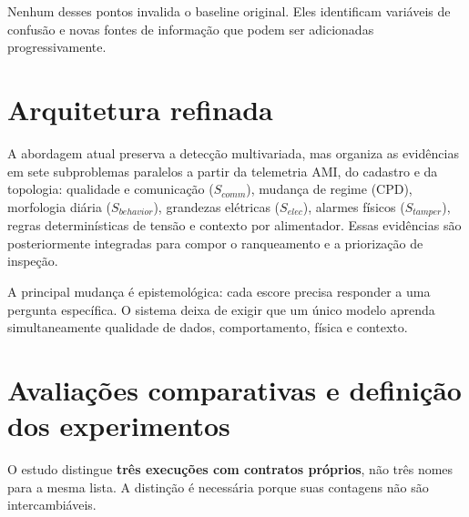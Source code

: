 Nenhum desses pontos invalida o baseline original. Eles identificam variáveis de confusão e novas fontes de informação que podem ser adicionadas progressivamente.

\section{Arquitetura refinada}\label{arquitetura-refinada}

A abordagem atual preserva a detecção multivariada, mas organiza as evidências em sete subproblemas paralelos a partir da telemetria AMI, do cadastro e da topologia: qualidade e comunicação ($S_{comm}$), mudança de regime (CPD), morfologia diária ($S_{behavior}$), grandezas elétricas ($S_{elec}$), alarmes físicos ($S_{tamper}$), regras determinísticas de tensão e contexto por alimentador. Essas evidências são posteriormente integradas para compor o ranqueamento e a priorização de inspeção.

A principal mudança é epistemológica: cada escore precisa responder a uma pergunta específica. O sistema deixa de exigir que um único modelo aprenda simultaneamente qualidade de dados, comportamento, física e contexto.

\section{Avaliações comparativas e definição dos experimentos}\label{desenho-de-ablauxe7uxe3o}

O estudo distingue \textbf{três execuções com contratos próprios}, não três nomes para a mesma lista. A distinção é necessária porque suas contagens não são intercambiáveis.

